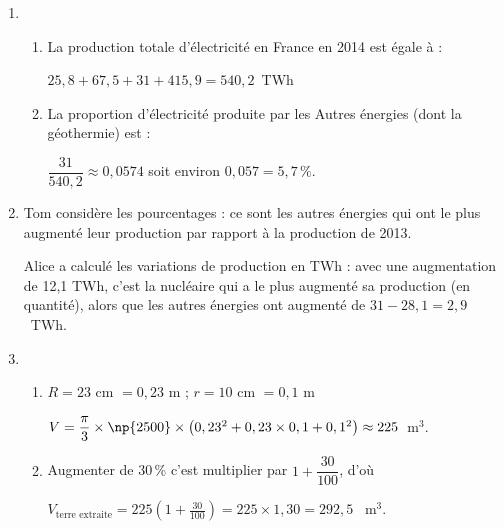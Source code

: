 
\medskip

\begin{enumerate}
\item 
	\begin{enumerate}
		\item La production totale d'électricité en France en 2014 est égale à :  
		
$25,8 + 67,5 + 31 + 415,9 = 540,2$~TWh
		\item La proportion d'électricité produite par les \og Autres énergies (dont la géothermie) \fg{} est :

$\dfrac{31}{540,2} \approx  0,0574$ soit environ $0,057  = 5,7\,\%$.
 	\end{enumerate}
\item Tom considère les pourcentages : ce sont les autres énergies qui ont le plus augmenté leur production par rapport à la production de 2013.

Alice a calculé les variations de production en TWh : avec une augmentation de 12,1 TWh, c'est la nucléaire qui a le plus augmenté sa production (en quantité), alors que les autres énergies ont augmenté de $31 - 28,1 = 2,9$~TWh.
\item 
	\begin{enumerate}
		\item $R = 23$ cm $= 0,23$ m ;  $r = 10$ cm $= 0,1$ m
		
$V = \dfrac{\pi}{3}\times \np{2500} \times \left(0,23^2 + 0,23 \times 0,1 + 0,1^2\right) \approx  225$~m$^3$.
		\item Augmenter de 30\,\% c'est multiplier par $1 + \dfrac{30}{100}$, d'où
		
		$V_{\text{terre extraite}} = 225 \left(1 + \frac{30}{100}\right) = 225 \times  1,30 = 292,5$~ m$^3$.
 	\end{enumerate}
\end{enumerate}

\vspace{0,5cm}

